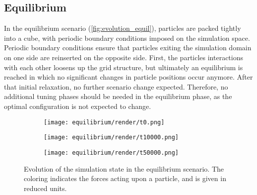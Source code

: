 \newcommand{\fastcolorbarhor}{%
	\centering
	\begin{tikzpicture}
		\node[anchor=east, align=center] at (-0.25cm,-0.25cm) {\si{F^{*}}};
		\pgfplotscolorbardrawstandalone[
			colorbar horizontal,
			colormap name=fast,
			point meta min=0,
			point meta max=50,
			colorbar style={
					width=3cm,
					xtick={0,10,...,50},
					tick align=outside,
					tick pos=top,
					xticklabel pos=top,
				},
		]
	\end{tikzpicture}
}


\subsection{Equilibrium}
\label{subsec:scenario_equil}
In the equilibrium scenario (\autoref{fig:evolution_equil}), particles are packed tightly into a cube, with periodic boundary conditions imposed on the simulation space. Periodic boundary conditions ensure that particles exiting the simulation domain on one side are reinserted on the opposite side. First, the particles interactions with each other loosens up the grid structure, but ultimately an equilibrium is reached in which no significant changes in particle positions occur anymore. After that initial relaxation, no further scenario change expected. Therefore, no additional tuning phases should be needed in the equilibrium phase, as the optimal configuration is not expected to change.

\begin{figure}[htpb]
	\centering
	\begin{subfigure}[c]{.3\textwidth}
		\texttt{[image: equilibrium/render/t0.png]}
	\end{subfigure}%
	\begin{subfigure}[c]{.3\textwidth}
		\texttt{[image: equilibrium/render/t10000.png]}
	\end{subfigure}%
	\begin{subfigure}[c]{.3\textwidth}
		\texttt{[image: equilibrium/render/t50000.png]}
	\end{subfigure}%
	\hfill\begin{subfigure}[c]{.08\textwidth}
		\fastcolorbar
	\end{subfigure}
	\caption{Evolution of the simulation state in the equilibrium scenario. The coloring indicates the forces acting upon a particle, and is given in reduced units.}
	\label{fig:evolution_equil}
\end{figure}


